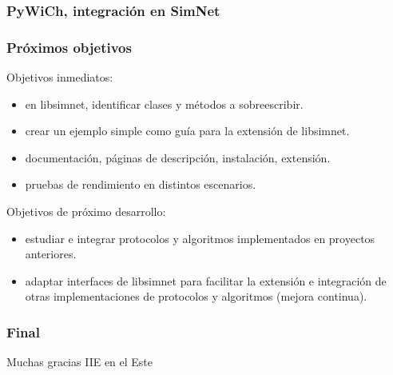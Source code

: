 \documentclass[spanish]{beamer}    %
\begin{document}

\begin{frame}[plain]
    \frametitle{PyWiCh, integración en SimNet}
    \center {}
\end{frame}


\begin{frame}
    \frametitle{Próximos objetivos}
    Objetivos inmediatos:
    \begin{itemize}
        \item en libsimnet, identificar clases y métodos a sobreescribir.
        \item crear un ejemplo simple como guía para la extensión de libsimnet.
        \item documentación, páginas de descripción, instalación, extensión.
        \item pruebas de rendimiento en distintos escenarios.
    \end{itemize}
    \vspace{0.5cm}
    Objetivos de próximo desarrollo:
    \begin{itemize}
        \item estudiar e integrar protocolos y algoritmos implementados en proyectos anteriores.
        \item adaptar interfaces de libsimnet para facilitar la extensión e integración de otras implementaciones de protocolos y algoritmos (mejora continua).
    \end{itemize}
\end{frame}


\begin{frame}
    \frametitle{Final}
    \center {}
    \vspace{0.5cm}
    \center Muchas gracias
    \center IIE en el Este
\end{frame}

\end{document}

